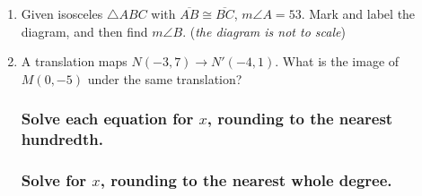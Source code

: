 \documentclass[12pt, twoside]{article}
\begin{document}
\begin{enumerate}
  \item Given isosceles $\triangle ABC$ with $\overline{AB} \cong \overline{BC}$, $m\angle A = 53$. Mark and label the diagram, and then find $m\angle B$. \hfill (\emph{the diagram is not to scale})
    \begin{flushright}
    \end{flushright}

  \item A translation maps $N(-3, 7) \rightarrow N'(-4,1)$. What is the image of $M(0,-5)$ under the same translation?

\newpage
\subsubsection*{Solve each equation for $x$, rounding to the nearest hundredth.}
\vspace{6cm}
\subsubsection*{Solve for $x$, rounding to the nearest whole degree.}


\end{enumerate}
\end{document}
